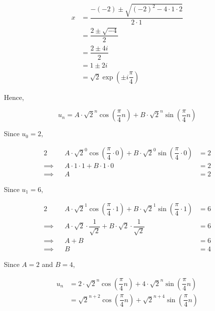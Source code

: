 \documentclass{jhwhw}
\begin{document}
            \begin{align*}
                x &= \dfrac{-(-2) \pm \sqrt{(-2)^2 - 4\cdot1\cdot2}}{2\cdot1}\\
                &= \dfrac{2 \pm \sqrt{-4}}{2}\\
                &= \dfrac{2 \pm 4i}{2}\\
                &= 1 \pm 2i\\
                &= \sqrt{2} \exp\left({\pm i \dfrac{\pi}4}\right)
            \end{align*}

            Hence,

            \begin{equation*}
                u_n = A \cdot \sqrt{2}^n \cos \left(\dfrac{\pi}4 n \right) + B \cdot \sqrt{2}^n \sin \left(\dfrac{\pi}4 n\right)
            \end{equation*}

            Since $u_0 = 2$,
            
            \begin{alignat*}{2}
                && A \cdot \sqrt{2}^0 \cos \left(\dfrac{\pi}4 \cdot 0 \right) + B \cdot \sqrt{2}^0 \sin \left(\dfrac{\pi}4 \cdot 0\right) &= 2\\
                \implies&& A \cdot 1 \cdot 1 + B \cdot 1 \cdot 0 &= 2\\
                \implies&& A &= 2
            \end{alignat*}

            Since $u_1 = 6$,

            \begin{alignat*}{2}
                && A \cdot \sqrt{2}^1 \cos \left(\dfrac{\pi}4 \cdot 1 \right) + B \cdot \sqrt{2}^1 \sin \left(\dfrac{\pi}4 \cdot 1\right) &= 6\\
                \implies&& A \cdot \sqrt{2} \cdot \dfrac{1}{\sqrt2} + B \cdot \sqrt{2} \cdot \dfrac{1}{\sqrt2} &= 6\\
                \implies&& A + B &= 6\\
                \implies&& B &= 4
            \end{alignat*}

            Since $A = 2$ and $B = 4$,

            \begin{align*}
                u_n &= 2 \cdot \sqrt{2}^n \cos \left(\dfrac{\pi}4 n \right) + 4 \cdot \sqrt{2}^n \sin \left(\dfrac{\pi}4 n\right)\\
                &= \sqrt{2}^{n+2} \cos \left(\dfrac{\pi}4 n \right) + \sqrt{2}^{n+4} \sin \left(\dfrac{\pi}4 n\right)
            \end{align*}
\end{document}
